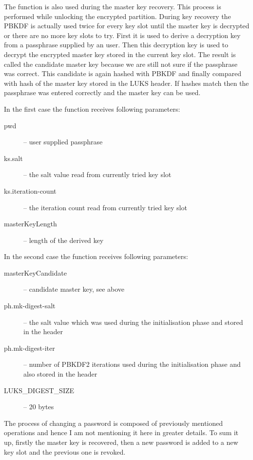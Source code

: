 \documentclass[nolof]{fithesis3}
\begin{document}
The function is also used during the master key recovery. This process is performed while unlocking the encrypted partition. During key recovery the PBKDF is actually used twice for every key slot until the master key is decrypted or there are no more key slots to try. First it is used to derive a decryption key from a passphrase supplied by an user. Then this decryption key is used to decrypt the encrypted master key stored in the current key slot. The result is called the candidate master key because we are still not sure if the passphrase was correct. This candidate is again hashed with PBKDF and finally compared with hash of the master key stored in the LUKS header. If hashes match then the passphrase was entered correctly and the master key can be used.

In the first case the function receives following parameters:

\begin{description}
\item[pwd] -- user supplied passphrase

\item[ks.salt] -- the salt value read from currently tried key slot

\item[ks.iteration-count] -- the iteration count read from currently tried key slot

\item[masterKeyLength] -- length of the derived key
\end{description}

In the second case the function receives following parameters:

\begin{description}
\item[masterKeyCandidate] -- candidate master key, see above

\item[ph.mk-digest-salt] -- the salt value which was used during the initialisation phase and stored in the header

\item[ph.mk-digest-iter] -- number of PBKDF2 iterations used during the initialisation phase and also stored in the header

\item[LUKS\_DIGEST\_SIZE] -- 20 bytes
\end{description}

The process of changing a password is composed of previously mentioned operations and hence I am not mentioning it here in greater details. To sum it up, firstly the master key is recovered, then a new password is added to a new key slot and the previous one is revoked.
\end{document}
